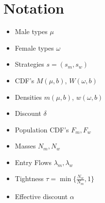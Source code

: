 \section{Notation}
\label{appx: c notation} 
\begin{itemize}
    \item Male types $\mu$
    \item Female types $\omega$
    \item Strategies $s=(s_m,s_w)$
    \item CDF's $M(\mu, b)$, $W(\omega,b)$
    \item Densities $m(\mu, b)$, $w(\omega,b)$
    \item Discount $\delta$ 
    \item Population CDF's $F_m, F_w$
    \item Masses $N_m, N_w$
    \item Entry Flows $\lambda_m, \lambda_w$
    \item Tightness $\tau = \min\{\frac{N_w}{N_m}, 1\}$
    \item Effective discount $\alpha$ 
\end{itemize}